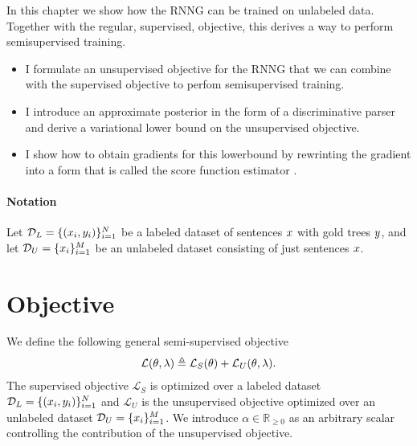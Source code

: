 % 

In this chapter we show how the RNNG can be trained on unlabeled data. Together with the regular, supervised, objective, this derives a way to perform semisupervised training.
\begin{itemize}
  \item I formulate an unsupervised objective for the RNNG that we can combine with the supervised objective to perfom semisupervised training.
  \item I introduce an approximate posterior in the form of a discriminative parser and derive a variational lower bound on the unsupervised objective.
  \item I show how to obtain gradients for this lowerbound by rewrinting the gradient into a form that is called the score function estimator \citep{williams1992reinforce,fu2006gradient}.
\end{itemize}

\paragraph{Notation} Let $\mathcal{D}_L = \{ (x_i, y_i)\}_{i=1}^N$ be a labeled dataset of sentences $x$ with gold trees $y$, and let $\mathcal{D}_U = \{ x_i \}_{i=1}^M$ be an unlabeled dataset consisting of just sentences $x$.

\section{Objective}
We define the following general semi-supervised objective
\begin{align*}
  \mathcal{L}(\theta, \lambda) \triangleq \mathcal{L}_{S}(\theta) + \mathcal{L}_{U}(\theta, \lambda).
\end{align*}
The supervised objective $\mathcal{L}_{S}$ is optimized over a labeled dataset $\mathcal{D}_L = \{ (x_i, y_i)\}_{i=1}^N$ and $\mathcal{L}_{U}$ is the unsupervised objective optimized over an unlabeled dataset $\mathcal{D}_U = \{ x_i \}_{i=1}^M$. We introduce $\alpha \in \mathbb{R}_{\geq 0}$ as an arbitrary scalar controlling the contribution of the unsupervised objective.

